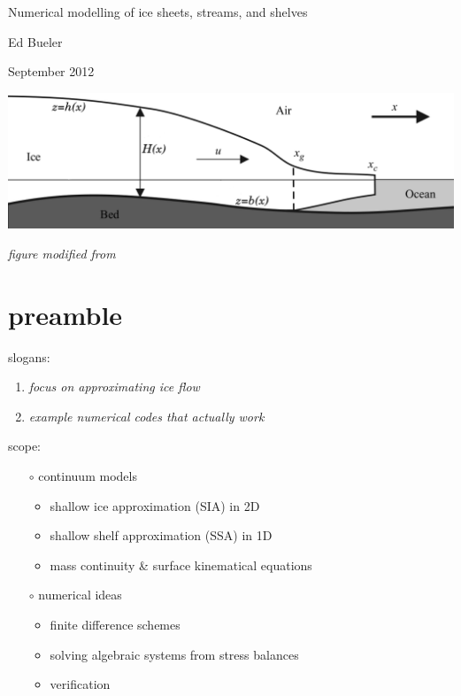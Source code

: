 \documentclass[titlepage,letterpaper,final,11pt]{scrartcl}
\newcommand{\alert}[1]{\emph{#1}}
\begin{document}
\graphicspath{{../photos/}{../pdffigs/}}


\begin{titlepage}

  \begin{center}
    {\Large{} Numerical modelling of ice sheets, streams, and shelves}
    \vspace{0.5cm}

    {\large Ed Bueler}
    \vspace{1cm}

    September 2012

    \vfill
    
    \includegraphics[width=6.0in]{flowline}
  
    \tiny \emph{figure modified from} \cite{SchoofMarine1} \normalsize
    
    \vspace{2.0in}
  \end{center}
\end{titlepage}


\section{preamble}

slogans:
  \begin{enumerate}
  \item \alert{focus on approximating ice flow}
  \item \alert{example numerical codes that actually work}
  \end{enumerate}
\medskip

scope:
  \begin{itemize}
  \item[$\circ$] continuum models

    \begin{itemize}
    \item shallow ice approximation (SIA) in 2D
    \item shallow shelf approximation (SSA) in 1D
    \item mass continuity \& surface kinematical equations
    \end{itemize}

  \item[$\circ$] numerical ideas

    \begin{itemize}
    \item finite difference schemes
    \item solving algebraic systems from stress balances
    \item verification
    \end{itemize}
  \end{itemize}
\end{document}
